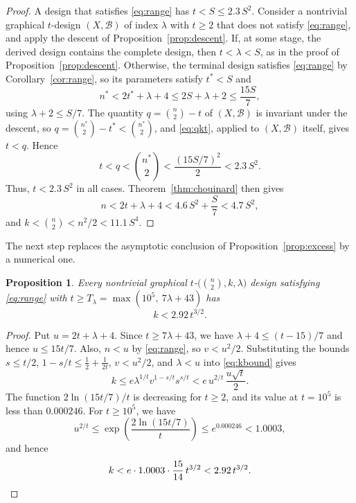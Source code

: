 \documentclass[12pt]{amsart}
\newtheorem{proposition}[theorem]{Proposition}
\theoremstyle{definition}
\newcommand{\cB}{\mathcal{B}}
\begin{document}
\begin{proof}
A design that satisfies \eqref{eq:range} has $t < S \leq 2.3\, S^2$.
Consider a nontrivial graphical $t$-design $(X, \cB)$ of index $\lambda$
with $t \geq 2$ that does not satisfy \eqref{eq:range}, and apply the
descent of Proposition~\ref{prop:descent}. If, at some stage, the derived
design contains the complete design, then $t < \lambda < S$, as in the proof
of Proposition~\ref{prop:descent}. Otherwise, the terminal design satisfies
\eqref{eq:range} by Corollary~\ref{cor:range}, so its parameters satisfy
$t^* < S$ and
\[
n^* < 2t^* + \lambda + 4 \leq 2S + \lambda + 2 \leq \frac{15S}{7},
\]
using $\lambda + 2 \leq S/7$. The quantity $q = \binom{n}{2} - t$ of $(X,
\cB)$ is invariant under the descent, so $q = \binom{n^*}{2} - t^* <
\binom{n^*}{2}$, and \eqref{eq:qkt}, applied to $(X, \cB)$ itself, gives $t
< q$. Hence
\[
t < q < \binom{n^*}{2} < \frac{(15S/7)^2}{2} < 2.3\, S^2.
\]
Thus, $t < 2.3\, S^2$ in all cases. Theorem~\ref{thm:chouinard} then gives
\[
n < 2t + \lambda + 4 < 4.6\, S^2 + \frac{S}{7} < 4.7\, S^2,
\]
and $k < \binom{n}{2} < n^2/2 < 11.1\, S^4$.
\end{proof}

The next step replaces the asymptotic conclusion of
Proposition~\ref{prop:excess} by a numerical one.

\begin{proposition}
\label{prop:excess2}
Every nontrivial graphical $t$-$\bigl(\binom{n}{2}, k, \lambda\bigr)$ design
satisfying \eqref{eq:range} with $t \geq T_\lambda = \max(10^5,\ 7\lambda +
43)$ has
\[
k < 2.92\, t^{3/2}.
\]
\end{proposition}

\begin{proof}
Put $u = 2t + \lambda + 4$. Since $t \geq 7\lambda + 43$, we have $\lambda +
4 \leq (t - 15)/7$ and hence $u \leq 15t/7$. Also, $n < u$ by
\eqref{eq:range}, so $v < u^2/2$. Substituting the bounds $s \leq t/2$, $1 -
s/t \leq \frac{1}{2} + \frac{1}{2t}$, $v < u^2/2$, and $\lambda < u$ into
\eqref{eq:kbound} gives
\[
k \leq e \lambda^{1/t} v^{1 - s/t} s^{s/t}
< e\, u^{2/t}\, \frac{u \sqrt{t}}{2}.
\]
The function $2\ln(15t/7)/t$ is decreasing for $t \geq 2$, and its value at
$t = 10^5$ is less than $0.000246$. For $t \geq 10^5$, we have
\[
u^{2/t} \leq \exp\left( \frac{2 \ln(15t/7)}{t} \right)
\leq e^{0.000246} < 1.0003,
\]
and hence
\[
k < e \cdot 1.0003 \cdot \frac{15}{14}\, t^{3/2} < 2.92\, t^{3/2}.
\qedhere
\]
\end{proof}
\end{document}
